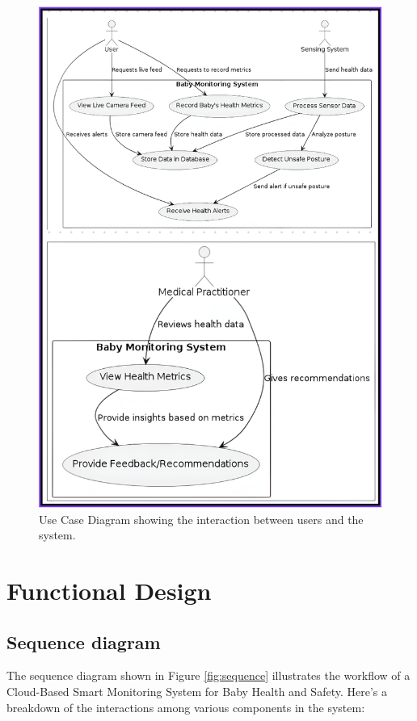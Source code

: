 \documentclass[12pt,a4paper]{report}
\begin{document}
\begin{figure}[hbtp]
  \centering
  \includegraphics[scale=0.9]{./pic/Use case.png}
  \caption{Use Case Diagram showing the interaction between users and the system.}
  \label{fig:usecase}
\end{figure}
\section{Functional Design}
\subsection{Sequence diagram}

The sequence diagram shown in Figure \ref{fig:sequence} illustrates the workflow of a Cloud-Based Smart Monitoring System for Baby Health and Safety. Here’s a breakdown of the interactions among various components in the system:
\end{document}
